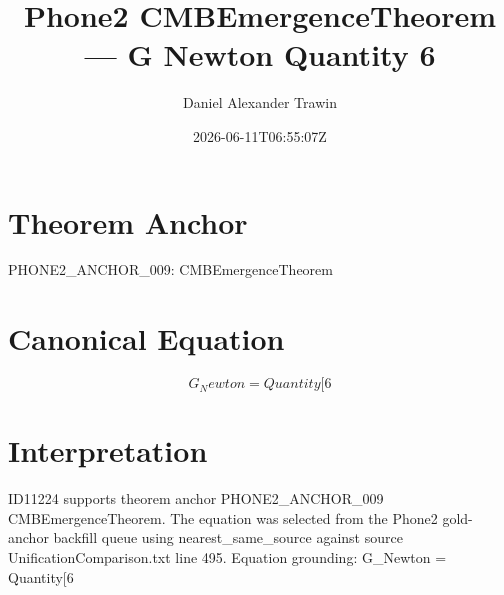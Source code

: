 \documentclass[11pt]{article}
\title{Phone2 CMBEmergenceTheorem — G Newton Quantity 6}
\author{Daniel Alexander Trawin}
\date{2026-06-11T06:55:07Z}
\begin{document}
\maketitle
\section*{Theorem Anchor}
PHONE2_ANCHOR_009: CMBEmergenceTheorem
\section*{Canonical Equation}
\[
G_Newton = Quantity[6
\]
\section*{Interpretation}
ID11224 supports theorem anchor PHONE2_ANCHOR_009 CMBEmergenceTheorem. The equation was selected from the Phone2 gold-anchor backfill queue using nearest_same_source against source UnificationComparison.txt line 495. Equation grounding: G_Newton = Quantity[6
\end{document}
